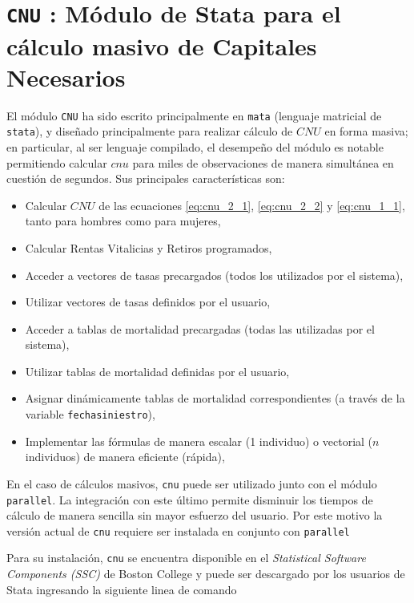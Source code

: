 \documentclass[letterpaper, 11pt]{article}
\begin{document}
\pagebreak

\section{{\tt CNU} : M\'odulo de Stata para el c\'alculo masivo de Capitales Necesarios}

El m\'odulo {\tt CNU} ha sido escrito principalmente en {\tt mata} (lenguaje matricial
de {\tt stata}), y dise\~nado principalmente para realizar c\'alculo de $CNU$ en
forma masiva; en particular, al ser lenguaje compilado, el desempe\~no del m\'odulo
es notable permitiendo calcular $cnu$ para miles de observaciones de manera
simult\'anea en cuesti\'on de segundos. Sus principales caracter\'isticas son:

\begin{itemize}
\item Calcular $CNU$ de las ecuaciones \ref{eq:cnu_2_1}, \ref{eq:cnu_2_2} y \ref{eq:cnu_1_1},
tanto para hombres como para mujeres,
\item Calcular Rentas Vitalicias y Retiros programados,
\item Acceder a vectores de tasas precargados (todos los utilizados por el sistema),
\item Utilizar vectores de tasas definidos por el usuario,
\item Acceder a tablas de mortalidad precargadas (todas las utilizadas por el sistema),
\item Utilizar tablas de mortalidad definidas por el usuario, 
\item Asignar din\'amicamente tablas de mortalidad correspondientes (a trav\'es
de la variable {\tt fechasiniestro}),
\item Implementar las f\'ormulas de manera escalar (1 individuo) o vectorial
($n$ individuos) de manera eficiente (r\'apida),
\end{itemize}

En el caso de c\'alculos masivos, {\tt cnu} puede ser utilizado junto con el m\'odulo
{\tt parallel}. La integraci\'on con este \'ultimo permite disminuir los tiempos
de c\'alculo de manera sencilla sin mayor esfuerzo del usuario. Por este motivo
la versi\'on actual de {\tt cnu} requiere ser instalada en conjunto con {\tt parallel}

Para su instalaci\'on, {\tt cnu} se encuentra disponible en el \emph{Statistical Software
Components (SSC)} de Boston College y puede ser descargado por los usuarios de Stata
ingresando la siguiente linea de comando
\end{document}
